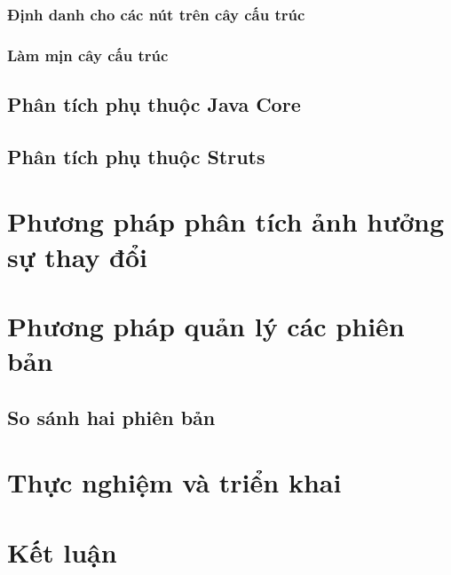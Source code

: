 \documentclass[12pt]{report}
\begin{document}
\subsection{Định danh cho các nút trên cây cấu trúc}
\subsection{Làm mịn cây cấu trúc}

\section{Phân tích phụ thuộc Java Core}
\section{Phân tích phụ thuộc Struts}

\chapter{Phương pháp phân tích ảnh hưởng sự thay đổi}
\chapter{Phương pháp quản lý các phiên bản}
\section{So sánh hai phiên bản}
\chapter{Thực nghiệm và triển khai}
\chapter{Kết luận}
\end{document}
